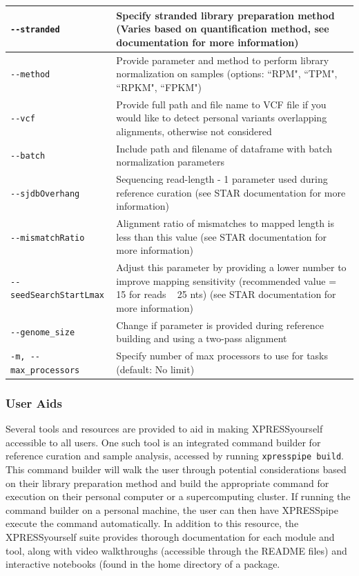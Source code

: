 \documentclass[10pt, oneside]{article}
\begin{document}
\begin{table}[!]
\begin{tabular}{p{5cm}p{13cm}}
 \hline
 \texttt{-{}-stranded} & Specify stranded library preparation method (Varies based on quantification method, see documentation for more information) \\
 \hline
 \texttt{-{}-method} & Provide parameter and method to perform library normalization on samples (options: ``RPM", ``TPM", ``RPKM", ``FPKM") \\
 \hline
 \texttt{-{}-vcf} & Provide full path and file name to VCF file if you would like to detect personal variants overlapping alignments, otherwise not considered \\
 \hline
 \texttt{-{}-batch} & Include path and filename of dataframe with batch normalization parameters \\
 \hline
 \texttt{-{}-sjdbOverhang} & Sequencing read-length - 1 parameter used during reference curation (see STAR documentation for more information) \\
 \hline
 \texttt{-{}-mismatchRatio} & Alignment ratio of mismatches to mapped length is less than this value (see STAR documentation for more information) \\
 \hline
 \texttt{-{}-seedSearchStartLmax} & Adjust this parameter by providing a lower number to improve mapping sensitivity (recommended value = 15 for reads ~ 25 nts) (see STAR documentation for more information) \\
 \hline
 \texttt{-{}-genome\_size} & Change if parameter is provided during reference building and using a two-pass alignment \\
 \hline
 \texttt{-m, -{}-max\_processors} & Specify number of max processors to use for tasks (default: No limit) \\
\end{tabular}
\end{table}

\subsubsection{User Aids}
Several tools and resources are provided to aid in making XPRESSyourself accessible to all users. One such tool is an integrated command builder for reference curation and sample analysis, accessed by running \texttt{xpresspipe build}. This command builder will walk the user through potential considerations based on their library preparation method and build the appropriate command for execution on their personal computer or a supercomputing cluster. If running the command builder on a personal machine, the user can then have XPRESSpipe execute the command automatically. In addition to this resource, the XPRESSyourself suite provides thorough documentation for each module and tool, along with video walkthroughs (accessible through the README files) and interactive notebooks (found in the home directory of a package.
\end{document}
